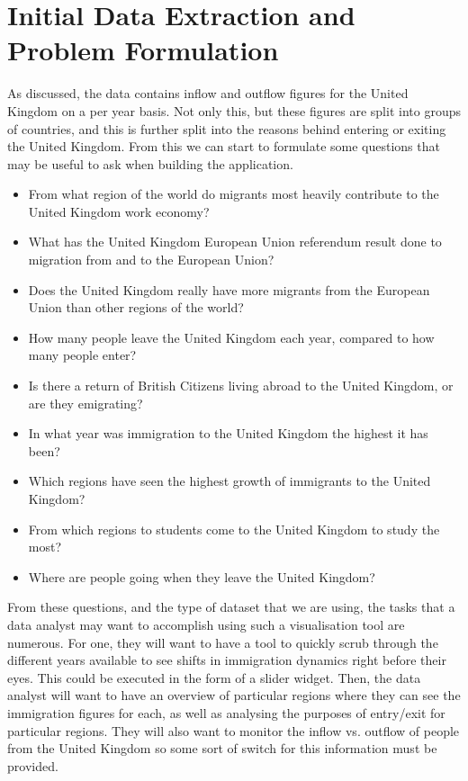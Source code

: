 \documentclass[11pt,a4paper,titlepage]{article}
\begin{document}
\section{Initial Data Extraction and Problem Formulation}
As discussed, the data contains inflow and outflow figures for the United Kingdom on a per year basis. Not only this, but these figures are split into groups of countries, and this is further split into the reasons behind entering or exiting the United Kingdom. From this we can start to formulate some questions that may be useful to ask when building the application.

\begin{itemize}
	\item From what region of the world do migrants most heavily contribute to the United Kingdom work economy?
	\item What has the United Kingdom European Union referendum result done to migration from and to the European Union?
	\item Does the United Kingdom really have more migrants from the European Union than other regions of the world?
	\item How many people leave the United Kingdom each year, compared to how many people enter?
	\item Is there a return of British Citizens living abroad to the United Kingdom, or are they emigrating?
	\item In what year was immigration to the United Kingdom the highest it has been?
	\item Which regions have seen the highest growth of immigrants to the United Kingdom?
	\item From which regions to students come to the United Kingdom  to study the most?
	\item Where are people going when they leave the United Kingdom?
\end{itemize}

From these questions, and the type of dataset that we are using, the tasks that a data analyst may want to accomplish using such a visualisation tool are numerous. For one, they will want to have a tool to quickly scrub through the different years available to see shifts in immigration dynamics right before their eyes. This could be executed in the form of a slider widget. Then, the data analyst will want to have an overview of particular regions where they can see the immigration figures for each, as well as analysing the purposes of entry/exit for particular regions. They will also want to monitor the inflow vs. outflow of people from the United Kingdom so some sort of switch for this information must be provided.
\end{document}
